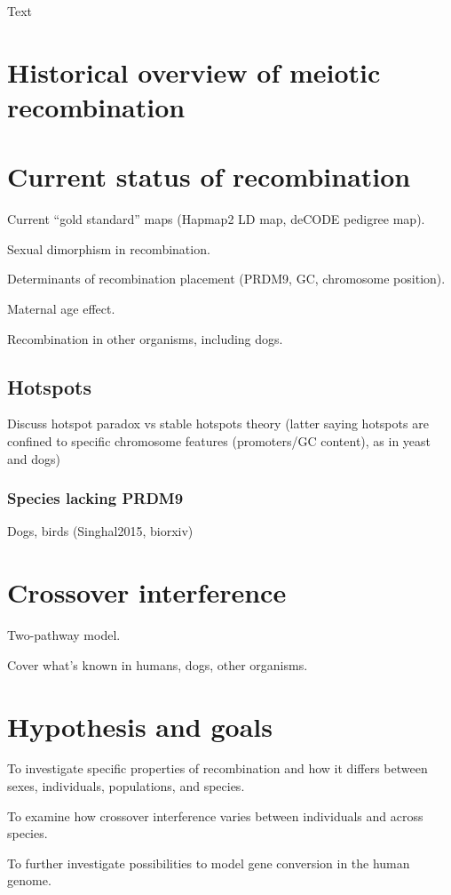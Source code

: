 
Text

\section{Historical overview of meiotic recombination}

\section{Current status of recombination}
\begin{titemize}
    \item Current ``gold standard'' maps (Hapmap2 LD map, deCODE pedigree map).
    \item Sexual dimorphism in recombination.
    \item Determinants of recombination placement (PRDM9, GC, chromosome position).
    \item Maternal age effect.
    \item Recombination in other organisms, including dogs.
\end{titemize}
\subsection{Hotspots}
Discuss hotspot paradox vs stable hotspots theory (latter saying hotspots are confined to specific chromosome features (promoters/GC content), as in yeast and dogs)
\subsubsection{Species lacking PRDM9}
Dogs, birds (Singhal2015, biorxiv) 
\section{Crossover interference}
\begin{titemize}
    \item Two-pathway model.
    \item Cover what's known in humans, dogs, other organisms.
\end{titemize}
\section{Hypothesis and goals}
\begin{titemize}
    \item To investigate specific properties of recombination and how it differs between sexes, individuals, populations, and species.
    \item To examine how crossover interference varies between individuals and across species.
    \item To further investigate possibilities to model gene conversion in the human genome.
\end{titemize}
